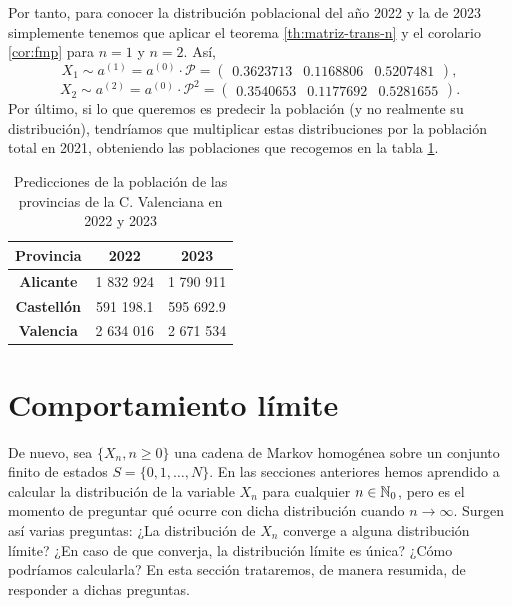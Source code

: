 \begin{ejemplo}
        
        Por tanto, para conocer la distribución poblacional del año 2022 y la de 2023 simplemente tenemos que aplicar el teorema \ref{th:matriz-trans-n} y el corolario \ref{cor:fmp} para $n=1$ y $n=2$. Así,
        \begin{equation*}
            X_1\sim a^{(1)} = a^{(0)}\cdot \mathcal P =\begin{pmatrix}
                0.3623713 &
                0.1168806 &
                0.5207481
            \end{pmatrix},
        \end{equation*}
        \begin{equation*}
            X_2 \sim a^{(2)} = a^{(0)}\cdot \mathcal P^2 = \begin{pmatrix}
                0.3540653 &
                0.1177692 &
                0.5281655
            \end{pmatrix}.
        \end{equation*}
        Por último, si lo que queremos es predecir la población (y no realmente su distribución), tendríamos que multiplicar estas distribuciones por la población total en 2021, obteniendo las poblaciones que recogemos en la tabla \ref{tab:predicciones}.

        \begin{table}[h]
            \centering
            \begin{tabular}{ccc}\hline
            \textbf{Provincia}          & \textbf{2022} & \textbf{2023} \\ \hline\hline
            \textbf{Alicante}   & 1 832 924   & 1 790 911     \\ \hline
            \textbf{Castellón} & 591 198.1     & 595 692.9    \\ \hline
            \textbf{Valencia}  & 2 634 016   & 2 671 534    \\ \hline
            \end{tabular}
            \caption{Predicciones de la población de las provincias de la C. Valenciana en 2022 y 2023}
            \label{tab:predicciones}
            \end{table}

\end{ejemplo}

\section{Comportamiento límite}

De nuevo, sea $\{X_n, n\geq 0\}$ una cadena de Markov homogénea sobre un conjunto finito de estados $S=\{0,1,\dots,N\}$. En las secciones anteriores hemos aprendido a calcular la distribución de la variable $X_n$ para cualquier $n\in\mathbb{N}_0$, pero es el momento de preguntar qué ocurre con dicha distribución cuando $n\rightarrow\infty$. Surgen así varias preguntas: ¿La distribución de $X_n$ converge a alguna distribución límite? ¿En caso de que converja, la distribución límite es única? ¿Cómo podríamos calcularla? En esta sección trataremos, de manera resumida, de responder a dichas preguntas.

